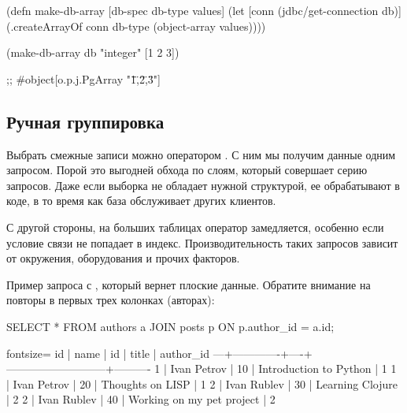 \begin{english}
  \begin{clojure}
(defn make-db-array
  [db-spec db-type values]
  (let [conn (jdbc/get-connection db)]
    (.createArrayOf conn db-type
                    (object-array values))))

(make-db-array db "integer" [1 2 3])

;; #object[o.p.j.PgArray "{\"1\",\"2\",\"3\"}"]
  \end{clojure}
\end{english}

\subsection{Ручная группировка}

Выбрать смежные записи можно оператором . С ним мы получим данные одним запросом. Порой это выгодней обхода по слоям, который совершает серию запросов. Даже если выборка не обладает нужной структурой, ее обрабатывают в коде, в то время как база обслуживает других клиентов.

С другой стороны, на больших таблицах оператор  замедляется, особенно если условие связи не попадает в индекс. Производительность таких запросов зависит от окружения, оборудования и прочих факторов.

Пример запроса с , который вернет плоские данные. Обратите внимание на повторы в первых трех колонках (авторах):

\begin{english}
  \begin{sql}
SELECT *
FROM authors a
JOIN posts p ON p.author_id = a.id;
  \end{sql}
\end{english}

\begin{english}
  \begin{text*}{fontsize=\small}
id |    name     | id |            title          | author_id
---+-------------+----+---------------------------+----------
 1 | Ivan Petrov | 10 | Introduction to Python    |         1
 1 | Ivan Petrov | 20 | Thoughts on LISP          |         1
 2 | Ivan Rublev | 30 | Learning Clojure          |         2
 2 | Ivan Rublev | 40 | Working on my pet project |         2
  \end{text*}
\end{english}


